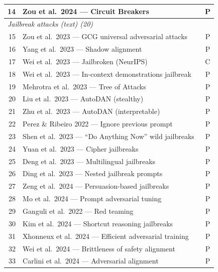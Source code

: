 \begin{longtable}{rp{12.0cm}c}
    14 & Zou et al.\ 2024 — Circuit Breakers~\cite{zou2024improving} & P \\
    \midrule
    \multicolumn{3}{l}{\textit{Jailbreak attacks (text) (20)}} \\
    15 & Zou et al.\ 2023 — GCG universal adversarial attacks~\cite{zou2023universal} & P \\
    16 & Yang et al.\ 2023 — Shadow alignment~\cite{yang2023shadow} & P \\
    17 & Wei et al.\ 2023 — Jailbroken (NeurIPS)~\cite{wei2023jailbroken} & C \\
    18 & Wei et al.\ 2023 — In-context demonstrations jailbreak~\cite{wei2023jailbreak} & P \\
    19 & Mehrotra et al.\ 2023 — Tree of Attacks~\cite{mehrotra2023tree} & P \\
    20 & Liu et al.\ 2023 — AutoDAN (stealthy)~\cite{liu2023autodan} & P \\
    21 & Zhu et al.\ 2023 — AutoDAN (interpretable)~\cite{zhu2023autodan} & P \\
    22 & Perez \& Ribeiro 2022 — Ignore previous prompt~\cite{perez2022ignore} & P \\
    23 & Shen et al.\ 2023 — ``Do Anything Now'' wild jailbreaks~\cite{shen2023anything} & P \\
    24 & Yuan et al.\ 2023 — Cipher jailbreaks~\cite{yuan2023gpt4} & P \\
    25 & Deng et al.\ 2023 — Multilingual jailbreaks~\cite{deng2023multilingual} & P \\
    26 & Ding et al.\ 2023 — Nested jailbreak prompts~\cite{ding2023wolf} & P \\
    27 & Zeng et al.\ 2024 — Persuasion-based jailbreaks~\cite{zeng2024johnny} & P \\
    28 & Mo et al.\ 2024 — Prompt adversarial tuning~\cite{mo2024fight} & P \\
    29 & Ganguli et al.\ 2022 — Red teaming~\cite{ganguli2022red} & P \\
    30 & Kim et al.\ 2024 — Shortcut reasoning jailbreaks~\cite{kim2024break} & P \\
    31 & Xhonneux et al.\ 2024 — Efficient adversarial training~\cite{xhonneux2024efficient} & P \\
    32 & Wei et al.\ 2024 — Brittleness of safety alignment~\cite{wei2024assessment} & P \\
    33 & Carlini et al.\ 2024 — Adversarial alignment~\cite{carlini2024aligned} & P \\

\end{longtable}
